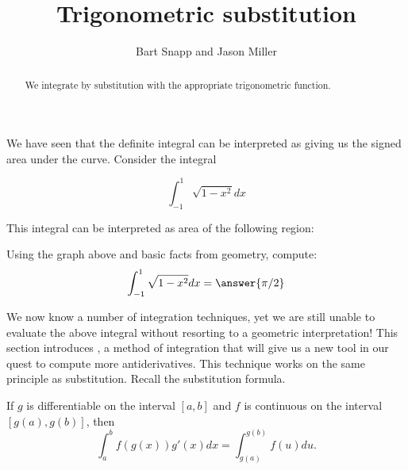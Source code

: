 \documentclass{ximera}
\author{Bart Snapp and Jason Miller}
\title[Dig-In:]{Trigonometric substitution}
\begin{document}
\begin{abstract}
  We integrate by substitution with the appropriate trigonometric
  function.
\end{abstract}
\maketitle

We have seen that the definite integral can be interpreted as giving us the signed area under the curve. Consider the integral 

\[
\int_{-1}^1 \sqrt{1-x^2} dx
\]

 This integral can be interpreted as area of the following region:
\begin{image}
\end{image}

\begin{question}
  Using the graph above and basic facts from geometry, compute:
  \[
  \int_{-1}^1 \sqrt{1-x^2} dx = \answer{\pi/2}
  \]
\end{question}

We now know a number of integration techniques, yet we are still
unable to evaluate the above integral without resorting to a geometric
interpretation!  This section introduces ,
a method of integration that will give us a new tool in our quest to compute more antiderivatives.
This technique works on the same principle as substitution. Recall the
substitution formula.

\begin{theorem} 
If $g$ is differentiable on the interval $[a,b]$ and $f$ is
continuous on the interval $[g(a),g(b)]$, then
\[
\int_a^b f(g(x)) g'(x) dx =\int_{g(a)}^{g(b)} f(u) du.
\]
\end{theorem}
\end{document}
